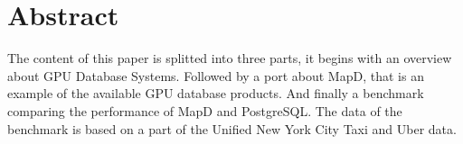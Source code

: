 \chapter*{Abstract}
The content of this paper is splitted into three parts, it begins with an overview about GPU Database Systems.
Followed by a port about MapD, that is an example of the available GPU database products.
And finally a benchmark comparing the performance of MapD and PostgreSQL.
The data of the benchmark is based on a part of the Unified New York City Taxi and Uber data.